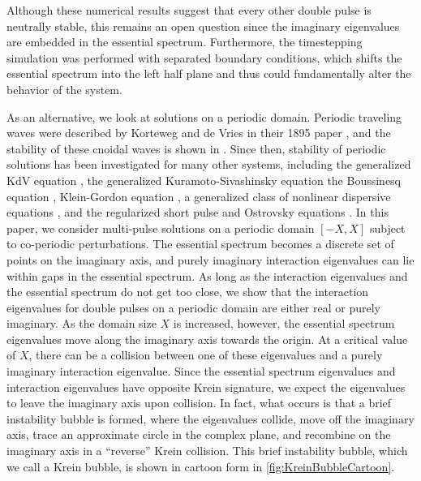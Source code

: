 \documentclass[10pt,reqno]{amsart}
\theoremstyle{plain}
\theoremstyle{definition}
\theoremstyle{remark}
\numberwithin{theorem}{section}
\numberwithin{equation}{section}
\begin{document}
\noi Although these numerical results suggest that every other double pulse is neutrally stable, this remains an open question since the imaginary eigenvalues are embedded in the essential spectrum. Furthermore, the timestepping simulation was performed with separated boundary conditions, which shifts the essential spectrum into the left half plane and thus could fundamentally alter the behavior of the system.

As an alternative, we look at solutions on a periodic domain. Periodic traveling waves were described by Korteweg and de Vries in their 1895 paper \cite{KdVoriginal}, and the stability of these cnoidal waves is shown in \cite{Pava2006,Bottman2009}. Since then, stability of periodic solutions has been investigated for many other systems, including the generalized KdV equation \cite{Johnson2009}, the generalized Kuramoto-Sivashinsky equation \cite{Barker2013} the Boussinesq equation \cite{Hakkaev2014}, Klein-Gordon equation \cite{Demirkaya2015}, a generalized class of nonlinear dispersive equations \cite{Hur2015}, and the regularized short pulse and Ostrovsky equations \cite{Hakkaev2017}. In this paper, we consider multi-pulse solutions on a periodic domain $[-X, X]$ subject to co-periodic perturbations. The essential spectrum becomes a discrete set of points on the imaginary axis, and purely imaginary interaction eigenvalues can lie within gaps in the essential spectrum. As long as the interaction eigenvalues and the essential spectrum do not get too close, we show that the interaction eigenvalues for double pulses on a periodic domain are either real or purely imaginary. As the domain size $X$ is increased, however, the essential spectrum eigenvalues move along the imaginary axis towards the origin. At a critical value of $X$, there can be a collision between one of these eigenvalues and a purely imaginary interaction eigenvalue. Since the essential spectrum eigenvalues and interaction eigenvalues have opposite Krein signature, we expect the eigenvalues to leave the imaginary axis upon collision. In fact, what occurs is that a brief instability bubble is formed, where the eigenvalues collide, move off the imaginary axis, trace an approximate circle in the complex plane, and recombine on the imaginary axis in a ``reverse'' Krein collision. This brief instability bubble, which we call a Krein bubble, is shown in cartoon form in \cref{fig:KreinBubbleCartoon}.
\end{document}

